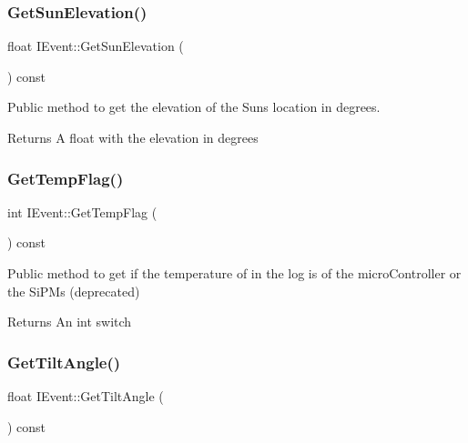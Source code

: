 \subsubsection{\texorpdfstring{Get\+Sun\+Elevation()}{GetSunElevation()}}
{\footnotesize\ttfamily float I\+Event\+::\+Get\+Sun\+Elevation (\begin{DoxyParamCaption}{ }\end{DoxyParamCaption}) const}



Public method to get the elevation of the Sun\textquotesingle{}s location in degrees. 

\begin{DoxyReturn}{Returns}
A float with the elevation in degrees 
\end{DoxyReturn}
\mbox{\label{classIEvent_ae951ab751628dbad6aa264d3e9bc49ce}} 
\subsubsection{\texorpdfstring{Get\+Temp\+Flag()}{GetTempFlag()}}
{\footnotesize\ttfamily int I\+Event\+::\+Get\+Temp\+Flag (\begin{DoxyParamCaption}{ }\end{DoxyParamCaption}) const}



Public method to get if the temperature of in the log is of the micro\+Controller or the Si\+P\+Ms (deprecated) 

\begin{DoxyReturn}{Returns}
An int switch 
\end{DoxyReturn}
\mbox{\label{classIEvent_aaac27f1be83fb9af936d26847478a44e}} 
\subsubsection{\texorpdfstring{Get\+Tilt\+Angle()}{GetTiltAngle()}}
{\footnotesize\ttfamily float I\+Event\+::\+Get\+Tilt\+Angle (\begin{DoxyParamCaption}{ }\end{DoxyParamCaption}) const}



